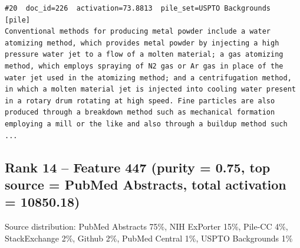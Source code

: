 \begin{verbatim}
#20  doc_id=226  activation=73.8813  pile_set=USPTO Backgrounds  [pile]
Conventional methods for producing metal powder include a water atomizing method, which provides metal powder by injecting a high pressure water jet to a flow of a molten material; a gas atomizing method, which employs spraying of N2 gas or Ar gas in place of the water jet used in the atomizing method; and a centrifugation method, in which a molten material jet is injected into cooling water present in a rotary drum rotating at high speed. Fine particles are also produced through a breakdown method such as mechanical formation employing a mill or the like and also through a buildup method such ...

\end{verbatim}

\subsection*{Rank 14 -- Feature 447 (purity = 0.75, top source = PubMed Abstracts, total activation = 10850.18)}

Source distribution: PubMed Abstracts 75\%, NIH ExPorter 15\%, Pile-CC 4\%, StackExchange 2\%, Github 2\%, PubMed Central 1\%, USPTO Backgrounds 1\%

